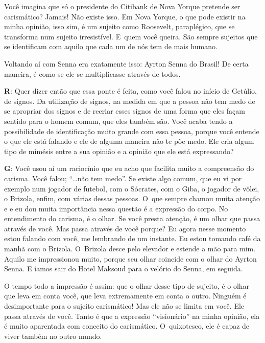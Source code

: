 Você imagina que só o presidente do Citibank de Nova Yorque pretende ser
carismático? Jamais! Não existe isso. Em Nova Yorque, o que pode existir
na minha opinião, isso sim, é um sujeito como Roosevelt, paraplégico,
que se transforma num sujeito irresistível. E~quem você queira. São
sempre sujeitos que se identificam com aquilo que cada um de nós tem
de mais humano.

 

Voltando aí com Senna era exatamente isso: Ayrton Senna do Brasil! De
certa maneira, é como se ele se multiplicasse através de todos.

 

\textbf{R}: Quer dizer então que essa ponte é feita, como você falou no
início de Getúlio, de signos. Da utilização de signos, na medida em que
a pessoa não tem medo de se apropriar dos signos e de recriar esses
signos de uma forma que eles façam sentido para o homem comum, que eles
também são. Você acaba tendo a possibilidade de identificação muito
grande com essa pessoa, porque você entende o que ele está falando e ele
de alguma maneira não te põe medo. Ele cria algum tipo de mimésis entre
a sua opinião e a opinião que ele está expressando?

 

\textbf{G}: Você usou aí um raciocínio que eu acho que facilita muito a
compreensão do carisma. Você falou; ``…não tem medo''. Se existe
algo comum, que eu vi por exemplo num jogador de futebol, com o Sócrates,
com o Giba, o jogador de vôlei, o Brizola, enfim, com várias dessas
pessoas. O~que sempre chamou muita atenção e e eu dou muita importância
nessa questão é a expressão do corpo. No entendimento do carisma, é o
olhar. Se você presta atenção, é um olhar que passa através de você. Mas
passa através de você porque? Eu agora nesse momento estou falando com
você, me lembrando de um instante. Eu estou tomando café da manhã com o
Brizola. O~Brizola desce pelo elevador e estende a mão para mim. Aquilo
me impressionou muito, porque seu olhar coincide com o olhar do Ayrton
Senna. E íamos sair do Hotel Maksoud para o velório do Senna, em seguida.

 

O tempo todo a impressão é assim: que o olhar desse tipo de sujeito, é
o olhar que leva em conta você, que leva extremamente em conta o outro.
Ninguém é desimportante para o sujeito carismático! Mas ele não se limita em você.
Ele passa através de você. Tanto é que a expressão ``visionário'' na
minha opinião, ela é muito aparentada com conceito do carismático. O~quixotesco, ele é capaz de viver também no outro mundo.

